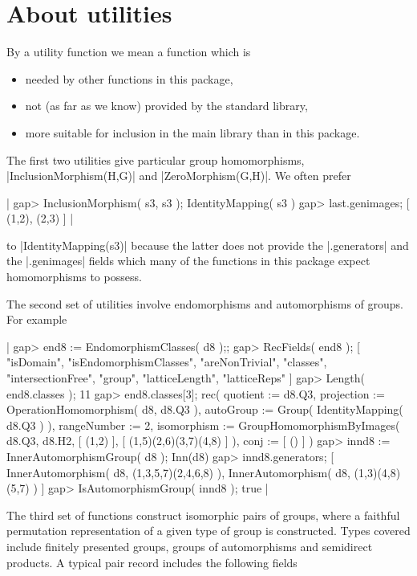 \section{About utilities}

By a utility function we mean a {\GAP} function which is\:
\begin{itemize}
\item needed by other functions in this package,
\item not (as far as we know) provided by the standard {\GAP} library,
\item more suitable for inclusion in the main library than in this package.
\end{itemize}

The first two utilities give particular group homomorphisms,
|InclusionMorphism(H,G)| and |ZeroMorphism(G,H)|.
We often prefer

|    gap> InclusionMorphism( s3, s3 );
    IdentityMapping( s3 )
    gap> last.genimages;
    [ (1,2), (2,3) ]  |

to |IdentityMapping(s3)| because the latter does not provide the
|.generators| and the |.genimages| fields which many of the functions 
in this package expect homomorphisms to possess.

The second set of utilities involve endomorphisms and automorphisms of 
groups.  For example\:

|    gap> end8 := EndomorphismClasses( d8 );;
    gap> RecFields( end8 );
    [ "isDomain", "isEndomorphismClasses", "areNonTrivial", "classes",
      "intersectionFree", "group", "latticeLength", "latticeReps" ]
    gap> Length( end8.classes );
    11
    gap> end8.classes[3];
    rec(
      quotient := d8.Q3,
      projection := OperationHomomorphism( d8, d8.Q3 ),
      autoGroup := Group( IdentityMapping( d8.Q3 ) ),
      rangeNumber := 2,
      isomorphism := GroupHomomorphismByImages( d8.Q3, d8.H2, [ (1,2) ], 
        [ (1,5)(2,6)(3,7)(4,8) ] ),
      conj := [ () ] )
    gap> innd8 := InnerAutomorphismGroup( d8 );
    Inn(d8)
    gap> innd8.generators;
    [ InnerAutomorphism( d8, (1,3,5,7)(2,4,6,8) ), 
      InnerAutomorphism( d8, (1,3)(4,8)(5,7) ) ]
    gap> IsAutomorphismGroup( innd8 );
    true   |

The third set of functions construct isomorphic pairs of groups,
where a faithful permutation representation of a given type of group 
is constructed.  Types covered include finitely presented groups,
groups of automorphisms and semidirect products.  
A typical pair record includes the following fields\:

